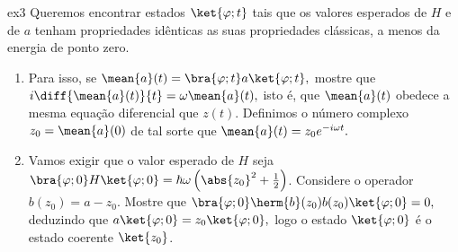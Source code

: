 \begin{exercício}{}{ex3}
   Queremos encontrar estados \(\ket{\varphi; t}\) tais que os valores esperados de \(H\) e de \(a\) tenham propriedades idênticas as suas propriedades clássicas, a menos da energia de ponto zero. 
   \begin{enumerate}[label=(\alph*)]
      \item Para isso, se \(\mean{a}(t) = \bra{\varphi; t}a\ket{\varphi; t},\) mostre que \(i \diff{\mean{a}(t)}{t} = \omega \mean{a}(t),\) isto é, que \(\mean{a}(t)\) obedece a mesma equação diferencial que \(z(t).\) Definimos o número complexo \(z_0 = \mean{a}(0)\) de tal sorte que \(\mean{a}(t) = z_0 e^{-i \omega t}.\)

      \item Vamos exigir que o valor esperado de \(H\) seja \(\bra{\varphi; 0} H \ket{\varphi; 0} = \hbar \omega \left(\abs{z_0}^2 + \frac12\right)\). Considere o operador \(b(z_0) = a - z_0.\) Mostre que \(\bra{\varphi; 0} \herm{b}(z_0) b(z_0) \ket{\varphi; 0} = 0,\) deduzindo que \(a \ket{\varphi; 0} = z_0 \ket{\varphi; 0},\) logo o estado \(\ket{\varphi; 0}\) é o estado coerente \(\ket{z_0}\).
   \end{enumerate}
\end{exercício}
